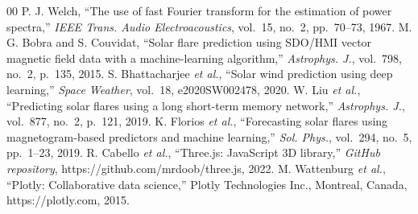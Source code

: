 \documentclass[conference,10pt,twocolumn]{IEEEtran}
\begin{document}
\begin{thebibliography}{00}
 P. J. Welch, ``The use of fast Fourier transform for the estimation of power spectra,'' \textit{IEEE Trans. Audio Electroacoustics}, vol.~15, no.~2, pp.~70--73, 1967.
 M. G. Bobra and S. Couvidat, ``Solar flare prediction using SDO/HMI vector magnetic field data with a machine-learning algorithm,'' \textit{Astrophys. J.}, vol.~798, no.~2, p.~135, 2015.
 S. Bhattacharjee \textit{et al.}, ``Solar wind prediction using deep learning,'' \textit{Space Weather}, vol.~18, e2020SW002478, 2020.
 W. Liu \textit{et al.}, ``Predicting solar flares using a long short-term memory network,'' \textit{Astrophys. J.}, vol.~877, no.~2, p.~121, 2019.
 K. Florios \textit{et al.}, ``Forecasting solar flares using magnetogram-based predictors and machine learning,'' \textit{Sol. Phys.}, vol.~294, no.~5, pp.~1--23, 2019.
 R. Cabello \textit{et al.}, ``Three.js: JavaScript 3D library,'' \textit{GitHub repository}, https://github.com/mrdoob/three.js, 2022.
 M. Wattenburg \textit{et al.}, ``Plotly: Collaborative data science,'' Plotly Technologies Inc., Montreal, Canada, https://plotly.com, 2015.
\end{thebibliography}
\end{document}
